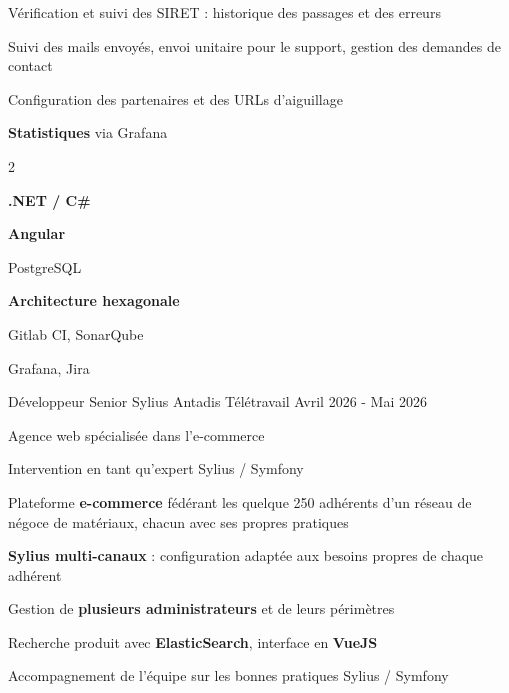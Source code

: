 \begin{cventries}
\begin{cvexperience}
		\begin{cvitems}
			\item {Vérification et suivi des SIRET : historique des passages et des erreurs}
			\item {Suivi des mails envoyés, envoi unitaire pour le support, gestion des demandes de contact}
			\item {Configuration des partenaires et des URLs d'aiguillage}
			\item {\textbf{Statistiques} via Grafana}
		\end{cvitems}

		\vspace{-5mm}
		\begin{multicols}{2}
			\begin{cvitems}
				\item \textbf{.NET / C\#}
				\item \textbf{Angular}
				\item PostgreSQL
				\item \textbf{Architecture hexagonale}
				\item Gitlab CI, SonarQube
				\item Grafana, Jira
			\end{cvitems}
		\end{multicols}
	\end{cvexperience}

	\begin{cvexperience}
		\cvbigentry
		{Développeur Senior Sylius} %
		{ Antadis} %
		{Télétravail} %
		{Avril 2026 - Mai 2026} %
		{
			\vspace{2mm}
			\begin{cvitems} %
				\item {Agence web spécialisée dans l'e-commerce}
				\item {Intervention en tant qu'expert Sylius / Symfony}
			\end{cvitems}
		}

		\begin{cvitems}
			\item {Plateforme \textbf{e-commerce} fédérant les quelque 250 adhérents d'un réseau de négoce de matériaux, chacun avec ses propres pratiques}
			\item {\textbf{Sylius multi-canaux} : configuration adaptée aux besoins propres de chaque adhérent}
			\item {Gestion de \textbf{plusieurs administrateurs} et de leurs périmètres}
			\item {Recherche produit avec \textbf{ElasticSearch}, interface en \textbf{VueJS}}
			\item {Accompagnement de l'équipe sur les bonnes pratiques Sylius / Symfony}
		\end{cvitems}


\end{cvexperience}
\end{cventries}
